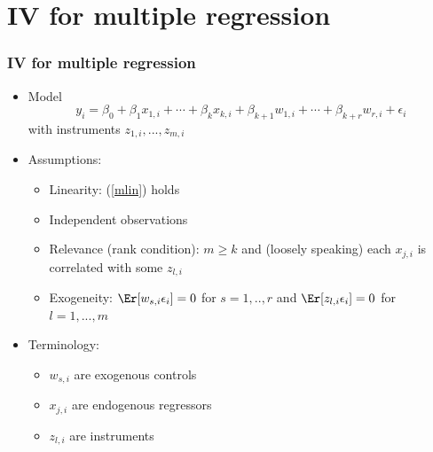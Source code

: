 \section{IV for multiple regression}
\begin{frame}[allowframebreaks]\frametitle{IV for multiple regression}
  \begin{itemize}
  \item Model
    \begin{equation}
      y_i = \beta_0 + \beta_1 x_{1,i} + \cdots + \beta_k x_{k,i} +
      \beta_{k+1} w_{1,i} + \cdots + \beta_{k+r} w_{r,i} + \epsilon_i \label{mlin}
    \end{equation}
    with instruments $z_{1,i}, ..., z_{m,i}$
  \item Assumptions:    
    \begin{itemize}
    \item[IV.1] Linearity: (\ref{mlin}) holds
    \item[IV.2] Independent observations
    \item[IV.3] Relevance (rank condition): $m \geq k$ and (loosely
      speaking) each $x_{j,i}$ is correlated with some $z_{l,i}$
    \item[IV.4] Exogeneity: $\Er[w_{s,i} \epsilon_i] = 0$ for
      $s=1,..,r$ and $\Er[z_{l,i} \epsilon_i ] = 0$ for $l=1,...,m$
    \end{itemize}
  \item Terminology:
    \begin{itemize}
    \item $w_{s,i}$ are exogenous controls
    \item $x_{j,i}$ are endogenous regressors
    \item $z_{l,i}$ are instruments
    \end{itemize}
  \end{itemize}
\end{frame}

